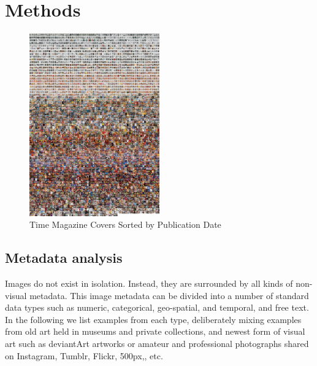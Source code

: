 \documentclass[letterpaper]{article}
\begin{document}
\section{Methods}

\begin{figure}[h!]
  \caption{Time Magazine Covers Sorted by Publication Date}
    \includegraphics[width=0.5\textwidth]{time_covers}
\end{figure}


\subsection{Metadata analysis}

Images do not exist in isolation. Instead, they are surrounded by all kinds of non-visual metadata. This image metadata can be divided into a number of standard data types such as numeric, categorical, geo-spatial, and temporal, and free text. In the following we list examples from each type, deliberately mixing examples from old art held in museums and private collections, and newest form of visual art such as deviantArt artworks or amateur and professional photographs shared on Instagram, Tumblr, Flickr, 500px,, etc. 
\end{document}
